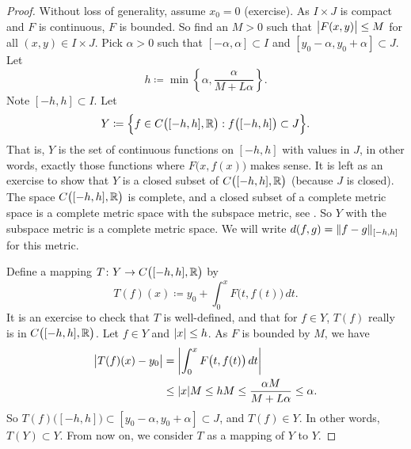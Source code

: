 \begin{proof}
Without loss of generality, assume $x_0 =0$ (exercise).
As $I \times J$ is compact and
$F$ is continuous, $F$ is bounded.
So find an $M > 0$ such that
$\bigl\lvert {F(x,y)} \bigr\rvert \leq M$ for all $(x,y) \in I\times J$.
Pick $\alpha > 0$ such that
$[-\alpha,\alpha] \subset I$ and $[y_0-\alpha, y_0 + \alpha] \subset J$.
Let
\begin{equation*}
h \coloneqq \min \left\{ \alpha, \frac{\alpha}{M+L\alpha} \right\} .
\end{equation*}
Note $[-h,h] \subset I$.  Let
\begin{equation*}
Y \coloneqq \Bigl\{ f \in C\bigl([-h,h],{\mathbb{R}}\bigr) : f\bigl([-h,h]\bigr) \subset J \Bigr\} .
\end{equation*}
That is, $Y$ is the set of continuous functions on $[-h,h]$ with values in
$J$, in other words,
exactly those functions where $F\bigl(x,f(x)\bigr)$ makes sense.
It is left as an exercise to show that $Y$ is a closed subset of $C\bigl([-h,h],{\mathbb{R}}\bigr)$
(because $J$ is closed).
The space $C\bigl([-h,h],{\mathbb{R}}\bigr)$ is complete, and
a closed subset of a complete metric space is a complete metric space with
the subspace metric, see .  So $Y$ with the
subspace metric is a complete metric space.
We will write $d(f,g) = \lVert {f-g} \rVert_{[-h,h]}$ for this metric.

Define a mapping
$T \colon Y \to C\bigl([-h,h],{\mathbb{R}}\bigr)$ by
\begin{equation*}
T(f)(x)
\coloneqq
y_0 + \int_0^x F\bigl(t,f(t)\bigr)\,dt .
\end{equation*}
It is an exercise to check that
$T$ is well-defined, and that for $f \in Y$, $T(f)$ really is in $C\bigl([-h,h],{\mathbb{R}}\bigr)$.
Let $f \in Y$ and $\lvert {x} \rvert \leq h$.
As $F$ is bounded by $M$, we have
\begin{equation*}
\begin{split}
\bigl\lvert {T(f)(x) - y_0} \bigr\rvert
&= \left\lvert {\int_0^x F\bigl(t,f(t)\bigr)\,dt} \right\rvert \\
& \leq 
\lvert {x} \rvert M \leq hM \leq \frac{\alpha M}{M+ L\alpha} \leq \alpha .
\end{split}
\end{equation*}
So $T(f)\bigl([-h,h]\bigr) \subset [y_0-\alpha,y_0+\alpha] \subset J$, and
$T(f) \in Y$.  In other words, $T(Y) \subset Y$.  From now on,
we consider $T$ as a mapping of $Y$ to $Y$.


\end{proof}

